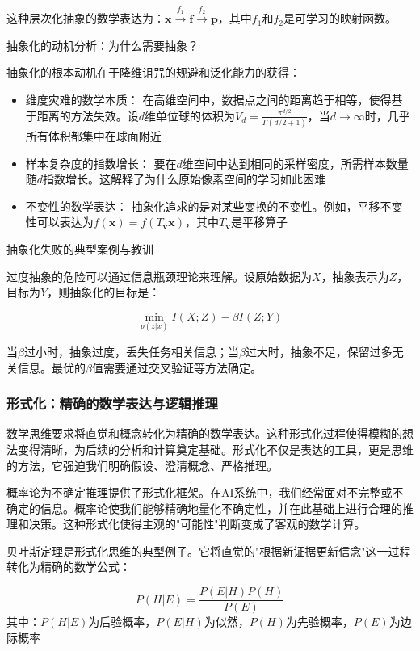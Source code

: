 这种层次化抽象的数学表达为：$\mathbf{x} \xrightarrow{f_1} \mathbf{f} \xrightarrow{f_2} \mathbf{p}$，其中$f_1$和$f_2$是可学习的映射函数。

抽象化的动机分析：为什么需要抽象？

抽象化的根本动机在于降维诅咒的规避和泛化能力的获得：
\begin{itemize}
\item 维度灾难的数学本质： 在高维空间中，数据点之间的距离趋于相等，使得基于距离的方法失效。设$d$维单位球的体积为$V_d = \frac{\pi^{d/2}}{\Gamma(d/2+1)}$，当$d \to \infty$时，几乎所有体积都集中在球面附近

\item 样本复杂度的指数增长： 要在$d$维空间中达到相同的采样密度，所需样本数量随$d$指数增长。这解释了为什么原始像素空间的学习如此困难

\item 不变性的数学表达： 抽象化追求的是对某些变换的不变性。例如，平移不变性可以表达为$f(\mathbf{x}) = f(T_{\mathbf{v}}\mathbf{x})$，其中$T_{\mathbf{v}}$是平移算子
\end{itemize}

抽象化失败的典型案例与教训

过度抽象的危险可以通过信息瓶颈理论来理解。设原始数据为$X$，抽象表示为$Z$，目标为$Y$，则抽象化的目标是：

$$\min_{p(z|x)} I(X;Z) - \beta I(Z;Y)$$

当$\beta$过小时，抽象过度，丢失任务相关信息；当$\beta$过大时，抽象不足，保留过多无关信息。最优的$\beta$值需要通过交叉验证等方法确定。

\subsubsection{形式化：精确的数学表达与逻辑推理}

数学思维要求将直觉和概念转化为精确的数学表达。这种形式化过程使得模糊的想法变得清晰，为后续的分析和计算奠定基础。形式化不仅是表达的工具，更是思维的方法，它强迫我们明确假设、澄清概念、严格推理。

概率论为不确定推理提供了形式化框架。在AI系统中，我们经常面对不完整或不确定的信息。概率论使我们能够精确地量化不确定性，并在此基础上进行合理的推理和决策。这种形式化使得主观的"可能性"判断变成了客观的数学计算。

贝叶斯定理是形式化思维的典型例子。它将直觉的"根据新证据更新信念"这一过程转化为精确的数学公式：

\begin{tcolorbox}[colback=green!5!white,colframe=green!75!black,title=核心定理：贝叶斯定理]
$$P(H|E) = \frac{P(E|H)P(H)}{P(E)}$$
其中：$P(H|E)$为后验概率，$P(E|H)$为似然，$P(H)$为先验概率，$P(E)$为边际概率
\end{tcolorbox}

